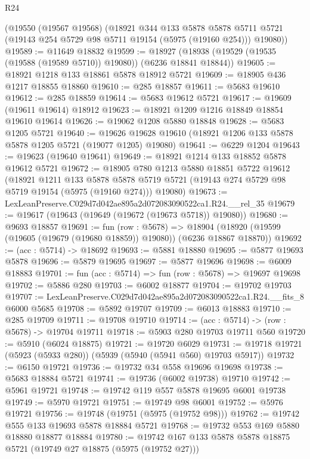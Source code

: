 \begin{lexlean}{R24}
\begin{coremodule}
    (@19550
      (@19567 @19568)
      (@18921
        @344
        @133
        @5878
        @5878
        @5711
        @5721
        (@19143 @254 @5729 @98 @5711 @19154 (@5975 (@19160 @254)))
        @19080))
@19589 := @11649 @18832
@19599 := @18927 (@18938 (@19529 (@19535 (@19588 (@19589 @5710)) @19080)) (@6236 @18841 @18844))
@19605 := @18921 @1218 @133 @18861 @5878 @18912 @5721
@19609 := @18905 @436 @1217 @18855 @18860
@19610 := @285 @18857
@19611 := @5683 @19610
@19612 := @285 @18859
@19614 := @5683 @19612 @5721
@19617 := @19609 (@19611 @19614) @18912
@19623 := @18921 @1209 @1216 @18849 @18854 @19610 @19614
@19626 := @19062 @1208 @5880 @18848
@19628 := @5683 @1205 @5721
@19640 := @19626 @19628 @19610 (@18921 @1206 @133 @5878 @5878 @1205 @5721 (@19077 @1205) @19080)
@19641 := @6229 @1204
@19643 := @19623 (@19640 @19641)
@19649 := @18921 @1214 @133 @18852 @5878 @19612 @5721
@19672 := @18905
    @780
    @1213
    @5880
    @18851
    @5722
    @19612
    (@18921
      @1211
      @133
      @5878
      @5878
      @5719
      @5721
      (@19143 @274 @5729 @98 @5719 @19154 (@5975 (@19160 @274)))
      @19080)
@19673 := LexLeanPreserve.C029d7d042ae895a2d072083090522ca1.R24.__rel_35
@19679 := @19617 (@19643 (@19649 (@19672 (@19673 @5718)) @19080))
@19680 := @9693 @18857
@19691 := fun (row : @5678) =>
  @18904 (@18920 (@19599 (@19605 (@19679 (@19680 @18859)) @19080)) (@6236 @18867 @18870))
@19692 := (acc : @5714) -> @18692
@19693 := @5881 @18880
@19695 := @5877 @19693 @5878
@19696 := @5879 @19695
@19697 := @5877 @19696
@19698 := @6009 @18883
@19701 := fun (acc : @5714) => fun (row : @5678) => @19697 @19698
@19702 := @5886 @280
@19703 := @6002 @18877
@19704 := @19702 @19703
@19707 := LexLeanPreserve.C029d7d042ae895a2d072083090522ca1.R24.__fits_8 @6000 @5685
@19708 := @5892 @19707
@19709 := @6013 @18883
@19710 := @285 @19709
@19711 := @19708 @19710
@19714 := (acc : @5714) -> (row : @5678) -> @19704 @19711
@19718 := @5903 @280 @19703 @19711 @560
@19720 := @5910 (@6024 @18875)
@19721 := @19720 @6029
@19731 := @19718 @19721 (@5923 (@5933 @280)) (@5939 (@5940 (@5941 @560) @19703 @5917))
@19732 := @6150 @19721
@19736 := @19732 @34 @558 @19696 @19698
@19738 := @5683 @18884 @5721
@19741 := @19736 (@6002 @19738) @19710
@19742 := @5961 @19721
@19748 := @19742 @119 @557 @5878 @19695 @6001 @19738
@19749 := @5970 @19721
@19751 := @19749 @98 @6001
@19752 := @5976 @19721
@19756 := @19748 (@19751 (@5975 (@19752 @98)))
@19762 := @19742 @555 @133 @19693 @5878 @18884 @5721
@19768 := @19732 @553 @169 @5880 @18880 @18877 @18884
@19780 := @19742 @167 @133 @5878 @5878 @18875 @5721 (@19749 @27 @18875 (@5975 (@19752 @27)))

\end{coremodule}
\end{lexlean}
